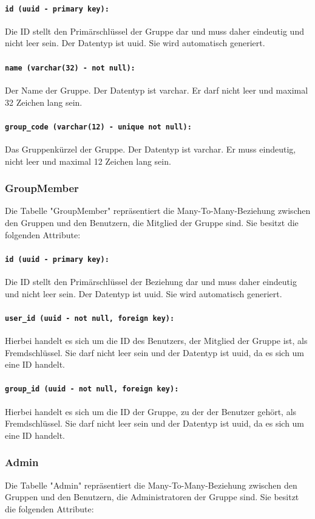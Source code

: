 \documentclass{entwurfsheft}
\begin{document}
\begin{sloppypar}
\paragraph{\texttt{id (uuid - primary key):}} Die ID stellt den Primärschlüssel der Gruppe dar und muss daher eindeutig und nicht leer sein. Der Datentyp ist \Gls{uuid}. Sie wird automatisch generiert.
\paragraph{\texttt{name (varchar(32) - not null):}} Der Name der Gruppe. Der Datentyp ist \Gls{varchar}. Er darf nicht leer und maximal 32 Zeichen lang sein.\paragraph{\texttt{group\_code (varchar(12) - unique not null):}} Das Gruppenkürzel der Gruppe. Der Datentyp ist \Gls{varchar}. Er muss eindeutig, nicht leer und maximal 12 Zeichen lang sein.
\newpage
\subsubsection{GroupMember}
Die Tabelle "GroupMember" repräsentiert die Many-To-Many-Beziehung zwischen den Gruppen und den Benutzern, die Mitglied der Gruppe sind. Sie besitzt die folgenden Attribute:
\paragraph{\texttt{id (uuid - primary key):}} Die ID stellt den Primärschlüssel der Beziehung dar und muss daher eindeutig und nicht leer sein. Der Datentyp ist \Gls{uuid}. Sie wird automatisch generiert.
\paragraph{\texttt{user\_id (uuid - not null, foreign key):}} Hierbei handelt es sich um die ID des Benutzers, der Mitglied der Gruppe ist, als Fremdschlüssel. Sie darf nicht leer sein und der Datentyp ist \Gls{uuid}, da es sich um eine ID handelt.
\paragraph{\texttt{group\_id (uuid - not null, foreign key):}} Hierbei handelt es sich um die ID der Gruppe, zu der der Benutzer gehört, als Fremdschlüssel. Sie darf nicht leer sein und der Datentyp ist \Gls{uuid}, da es sich um eine ID handelt.
\newpage
\subsubsection{Admin}
Die Tabelle "Admin" repräsentiert die Many-To-Many-Beziehung zwischen den Gruppen und den Benutzern, die Administratoren der Gruppe sind. Sie besitzt die folgenden Attribute:

\end{sloppypar}
\end{document}

